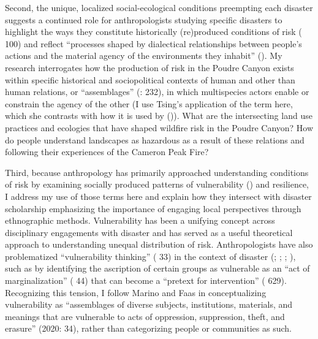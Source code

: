 \documentclass[
]{article}
\begin{document}
Second, the unique, localized social-ecological conditions preempting each disaster suggests a continued role for anthropologists studying specific disasters to highlight the ways they constitute historically (re)produced conditions of risk ( 100) and reflect ``processes shaped by dialectical relationships between people's actions and the material agency of the environments they inhabit'' (). My research interrogates how the production of risk in the Poudre Canyon exists within specific historical and sociopolitical contexts of human and other than human relations, or ``assemblages'' (: 232), in which multispecies actors enable or constrain the agency of the other (I use Tsing's application of the term here, which she contrasts with how it is used by ()). What are the intersecting land use practices and ecologies that have shaped wildfire risk in the Poudre Canyon? How do people understand landscapes as hazardous as a result of these relations and following their experiences of the Cameron Peak Fire?

Third, because anthropology has primarily approached understanding conditions of risk by examining socially produced patterns of vulnerability () and resilience, I address my use of those terms here and explain how they intersect with disaster scholarship emphasizing the importance of engaging local perspectives through ethnographic methods. Vulnerability has been a unifying concept across disciplinary engagements with disaster and has served as a useful theoretical approach to understanding unequal distribution of risk. Anthropologists have also problematized ``vulnerability thinking'' ( 33) in the context of disaster (; ; ; ), such as by identifying the ascription of certain groups as vulnerable as an ``act of marginalization'' ( 44) that can become a ``pretext for intervention'' ( 629). Recognizing this tension, I follow Marino and Faas in conceptualizing vulnerability as ``assemblages of diverse subjects, institutions, materials, and meanings that are vulnerable to acts of oppression, suppression, theft, and erasure'' (2020: 34), rather than categorizing people or communities as such.
\end{document}
